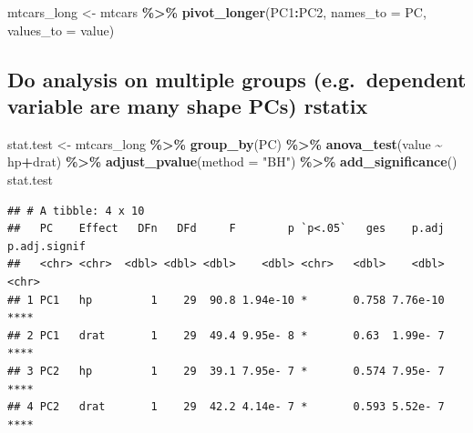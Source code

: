 \documentclass[
]{article}
\newenvironment{Shaded}{\begin{snugshade}}{\end{snugshade}}
\newcommand{\AttributeTok}[1]{\textcolor[rgb]{0.13,0.29,0.53}{#1}}
\newcommand{\FunctionTok}[1]{\textcolor[rgb]{0.13,0.29,0.53}{\textbf{#1}}}
\newcommand{\NormalTok}[1]{#1}
\newcommand{\OtherTok}[1]{\textcolor[rgb]{0.56,0.35,0.01}{#1}}
\newcommand{\SpecialCharTok}[1]{\textcolor[rgb]{0.81,0.36,0.00}{\textbf{#1}}}
\newcommand{\StringTok}[1]{\textcolor[rgb]{0.31,0.60,0.02}{#1}}
\begin{document}
\begin{Shaded}
\begin{Highlighting}[]
\NormalTok{mtcars\_long }\OtherTok{\textless{}{-}}\NormalTok{ mtcars }\SpecialCharTok{\%\textgreater{}\%} \FunctionTok{pivot\_longer}\NormalTok{(PC1}\SpecialCharTok{:}\NormalTok{PC2, }\AttributeTok{names\_to =} \StringTok{\textquotesingle{}PC\textquotesingle{}}\NormalTok{, }\AttributeTok{values\_to =} \StringTok{\textquotesingle{}value\textquotesingle{}}\NormalTok{)}
\end{Highlighting}
\end{Shaded}

\hypertarget{do-analysis-on-multiple-groups-e.g.-dependent-variable-are-many-shape-pcs-rstatix}{%
\subsection{Do analysis on multiple groups (e.g.~dependent variable are many shape PCs) rstatix}\label{do-analysis-on-multiple-groups-e.g.-dependent-variable-are-many-shape-pcs-rstatix}}

\begin{Shaded}
\begin{Highlighting}[]
\NormalTok{stat.test }\OtherTok{\textless{}{-}}\NormalTok{ mtcars\_long }\SpecialCharTok{\%\textgreater{}\%} 
  \FunctionTok{group\_by}\NormalTok{(PC) }\SpecialCharTok{\%\textgreater{}\%}
  \FunctionTok{anova\_test}\NormalTok{(value }\SpecialCharTok{\textasciitilde{}}\NormalTok{ hp}\SpecialCharTok{+}\NormalTok{drat) }\SpecialCharTok{\%\textgreater{}\%}
  \FunctionTok{adjust\_pvalue}\NormalTok{(}\AttributeTok{method =} \StringTok{"BH"}\NormalTok{) }\SpecialCharTok{\%\textgreater{}\%}
  \FunctionTok{add\_significance}\NormalTok{()}
\NormalTok{stat.test}
\end{Highlighting}
\end{Shaded}

\begin{verbatim}
## # A tibble: 4 x 10
##   PC    Effect   DFn   DFd     F        p `p<.05`   ges    p.adj p.adj.signif
##   <chr> <chr>  <dbl> <dbl> <dbl>    <dbl> <chr>   <dbl>    <dbl> <chr>       
## 1 PC1   hp         1    29  90.8 1.94e-10 *       0.758 7.76e-10 ****        
## 2 PC1   drat       1    29  49.4 9.95e- 8 *       0.63  1.99e- 7 ****        
## 3 PC2   hp         1    29  39.1 7.95e- 7 *       0.574 7.95e- 7 ****        
## 4 PC2   drat       1    29  42.2 4.14e- 7 *       0.593 5.52e- 7 ****
\end{verbatim}
\end{document}
